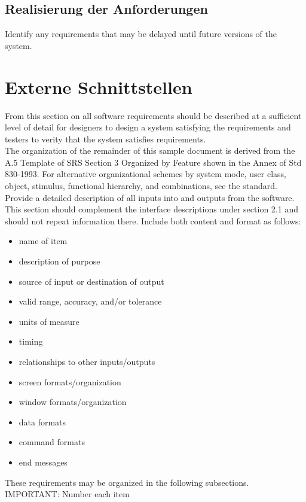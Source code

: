 \subsection{Realisierung der Anforderungen}
Identify any requirements that may be delayed until future versions of the system.

\newpage

\section{Externe Schnittstellen}
From this section on all software requirements should be described at a sufficient level of detail for designers to design a system satisfying the requirements and testers to verity that the system satisfies requirements. \\[-0.3cm]

\noindent The organization of the remainder of this sample document is derived from the A.5 Template of SRS Section 3 Organized by Feature shown in the Annex of Std 830-1993. For alternative organizational schemes by system mode, user class, object, stimulus, functional hierarchy, and combinations, see the standard. \\[-0.3cm]

\noindent Provide a detailed description of all inputs into and outputs from the software. This section should complement the interface descriptions under section 2.1 and should not repeat information there. Include both content and format as follows:
\begin{itemize}
	\item name of item
	\item description of purpose
	\item source of input or destination of output
	\item valid range, accuracy, and/or tolerance
	\item units of measure
	\item timing
	\item relationships to other inputs/outputs
	\item screen formats/organization
	\item window formats/organization
	\item data formats
	\item command formats
	\item end messages
\end{itemize}

\noindent These requirements may be organized in the following subsections. \\[0.1cm]
IMPORTANT: Number each item


